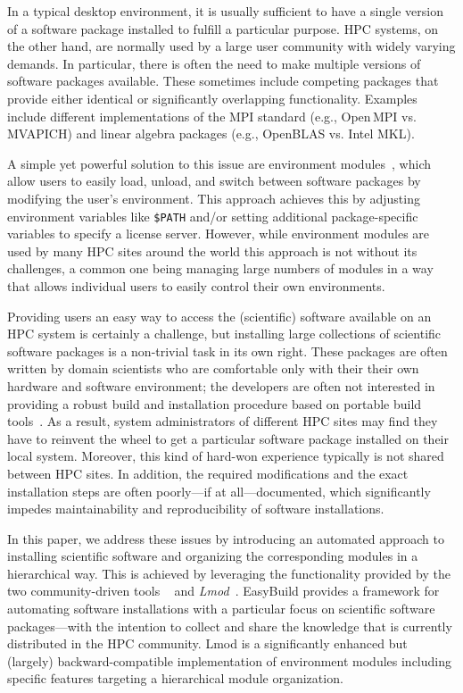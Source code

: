 In a typical desktop environment, it is usually sufficient to have a
single version of a software package installed to fulfill a particular purpose. HPC
systems, on the other hand, are normally used by a large user community with widely varying
demands. In particular, there is often the need to make multiple versions of
software packages available. These sometimes include competing packages
that provide either identical or significantly overlapping functionality. Examples include
 different implementations of the MPI standard (e.g., Open\,MPI vs.
MVAPICH) and linear algebra packages (e.g., OpenBLAS vs. Intel MKL).

A simple yet powerful solution to this issue are environment
modules~\cite{furlani91,furlani96,eadline,laytonEM1}, which allow
users to easily load, unload, and switch between software packages by
modifying the user's environment. This approach achieves this by adjusting environment
variables like \texttt{\small\$PATH} and/or setting additional package-specific
variables to specify a license server.
However, while environment modules are used by many
HPC sites around the world this approach is not without its challenges,
a common one being managing large numbers of modules in a way that allows individual
users to easily control their own environments.

Providing users an easy way to access the (scientific) software
available on an HPC system is certainly a challenge, but installing large collections
of scientific software packages is a
non-trivial task in its own right. These packages are often written by domain
scientists who are comfortable only with their their own hardware and software
environment; the developers are often not interested in providing a robust
build and installation procedure based on portable build
tools~\cite{Dubois03}. As a result, system administrators of different HPC sites may
find they have to reinvent the wheel to
get a particular software package installed on their local system. Moreover, this
kind of hard-won experience typically is not shared between HPC sites. In
addition, the required modifications and the exact installation steps are
often poorly---if at all---documented, which significantly impedes
maintainability and reproducibility of software installations.

In this paper, we address these issues by introducing an automated approach to
installing scientific software and organizing the corresponding modules in a
hierarchical way. This is achieved by leveraging the functionality provided by the
two community-driven tools \emph{\easybuild{}}~\cite{EasyBuildSC12} and
\emph{Lmod}~\cite{taccLmod}. EasyBuild provides a
framework for automating software installations with a particular focus on
scientific software packages---with the intention to collect and share the
knowledge that is currently distributed in the HPC community.
Lmod is a significantly enhanced but
(largely) backward-compatible implementation of environment modules including specific
features targeting a hierarchical module organization.

